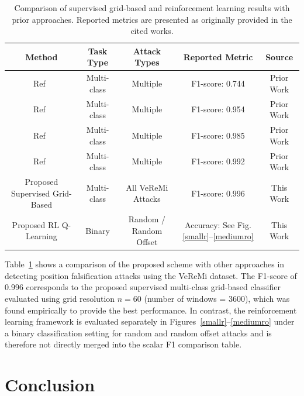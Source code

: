 \documentclass[conference]{IEEEtran}
\begin{document}
\begin{table}[]
\begin{center}

\begin{tabular}{ |c|c|c|c|c| } 
\hline
Method & Task Type & Attack Types & Reported Metric & Source\\
\hline
Ref~\cite{LLR1} & Multi-class & Multiple & F1-score: 0.744 & Prior Work\\ 
Ref~\cite{LLR7} & Multi-class & Multiple & F1-score: 0.954 & Prior Work\\ 
Ref~\cite{LLR10} & Multi-class & Multiple & F1-score: 0.985 & Prior Work\\ 
Ref~\cite{Chamath1} & Multi-class & Multiple & F1-score: 0.992 & Prior Work\\ 
Proposed Supervised Grid-Based & Multi-class & All VeReMi Attacks & F1-score: 0.996 & This Work\\ 
Proposed RL Q-Learning & Binary & Random / Random Offset & Accuracy: See Fig. \ref{smallr}--\ref{mediumro} & This Work\\ 
\hline
\end{tabular}

\caption{Comparison of supervised grid-based and reinforcement learning results with prior approaches. Reported metrics are presented as originally provided in the cited works.}
\label{tab1}
\end{center}
\end{table}

Table~\ref{tab1} shows a comparison of the proposed scheme with other approaches in detecting position falsification attacks using the VeReMi dataset. The F1-score of 0.996 corresponds to the proposed supervised multi-class grid-based classifier evaluated using grid resolution $n=60$ (number of windows = 3600), which was found empirically to provide the best performance. In contrast, the reinforcement learning framework is evaluated separately in Figures~\ref{smallr}--\ref{mediumro} under a binary classification setting for random and random offset attacks and is therefore not directly merged into the scalar F1 comparison table.



\section{Conclusion}
\end{document}
